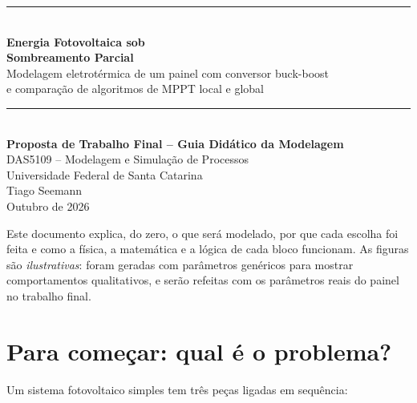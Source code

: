 \documentclass[11pt,a4paper]{article}
\begin{document}
\begin{titlepage}
\centering
\vspace*{2.5cm}
{\color{azul}\rule{\linewidth}{1.2pt}}\\[0.6cm]
{\Huge\bfseries Energia Fotovoltaica sob\\[0.25cm] Sombreamento Parcial}\\[0.5cm]
{\Large Modelagem eletrotérmica de um painel com conversor buck-boost\\
e comparação de algoritmos de MPPT local e global}\\[0.4cm]
{\color{azul}\rule{\linewidth}{1.2pt}}\\[1.2cm]
{\large\bfseries Proposta de Trabalho Final -- Guia Didático da Modelagem}\\[2.5cm]
{\large DAS5109 -- Modelagem e Simulação de Processos}\\[0.3cm]
{\large Universidade Federal de Santa Catarina}\\[2cm]
{\large Tiago Seemann}\\[0.3cm]
{\large Outubro de 2026}
\vfill
\begin{minipage}{0.85\linewidth}\small\color{cinza}
Este documento explica, do zero, o que será modelado, por que cada escolha foi feita e
como a física, a matemática e a lógica de cada bloco funcionam. As figuras são
\emph{ilustrativas}: foram geradas com parâmetros genéricos para mostrar comportamentos
qualitativos, e serão refeitas com os parâmetros reais do painel no trabalho final.
\end{minipage}
\end{titlepage}

\setcounter{tocdepth}{2}
{\small\tableofcontents}
\newpage

\section{Para começar: qual é o problema?}

Um sistema fotovoltaico simples tem três peças ligadas em sequência:

\begin{center}
\end{center}
\end{document}

